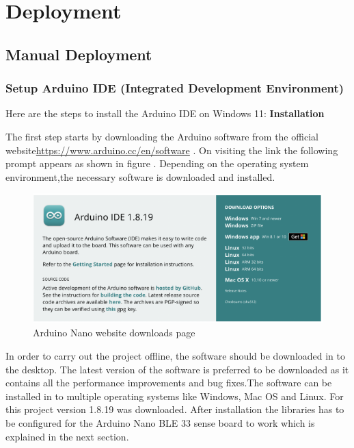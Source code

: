 %
%

\chapter{Deployment}
\label{chapter:Deployment}


\section{Manual Deployment}
\subsection{Setup Arduino IDE (Integrated Development Environment)}
\label{subsection:SetupArduinoIDE}
Here are the steps to install the Arduino IDE on Windows 11:
\newline
\textbf{Installation}

The first step starts by downloading the Arduino software from the official website\url{https://www.arduino.cc/en/software}
. On visiting the link the following
prompt appears as shown in figure . Depending on the operating system environment,the
necessary software is downloaded and installed.

\begin{figure}[h!]
	\centering
	\includegraphics[width=1.0\textwidth]{Images/Deployment/Arduino-Nano-website-downloads-page}
	\caption{Arduino Nano website downloads page} \label{fig:Arduino-Nano-website-downloads-page}
\end{figure}

In order to carry out the project offline, the software should be downloaded in to the
desktop. The latest version of the software is preferred to be downloaded as it contains
all the performance improvements and bug fixes.The software can be installed in to
multiple operating systems like Windows, Mac OS and Linux. For this project version
1.8.19 was downloaded. After installation the libraries has to be configured for the
Arduino Nano BLE 33 sense board to work which is explained in the next section.

